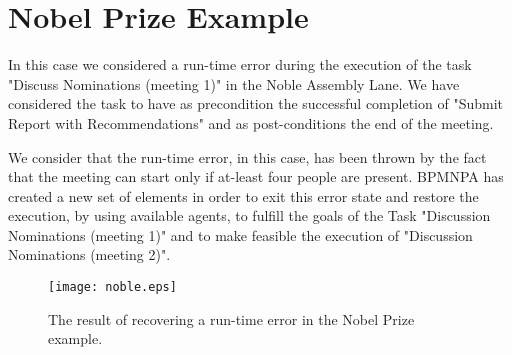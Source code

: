 \section{Nobel Prize Example}
\label{sec:456}
In this case we considered a run-time error during the execution of the task "Discuss Nominations (meeting 1)" in the Noble Assembly Lane. We have considered the task to have as precondition the successful completion of "Submit Report with Recommendations" and as post-conditions the end of the meeting.


We consider that the run-time error, in this case, has been thrown by the fact that the meeting can start only if at-least four people are present. BPMNPA has created a new set of elements in order to exit this error state and restore the execution, by using available agents, to fulfill the goals of the Task "Discussion Nominations (meeting 1)" and to make feasible the execution of "Discussion Nominations (meeting 2)".

\begin{center}
\begin{figure}[h!]
		\centerline{\texttt{[image: noble.eps]}}
		\caption{The result of recovering a run-time error in the Nobel Prize example.}
\end{figure}
\end{center}

